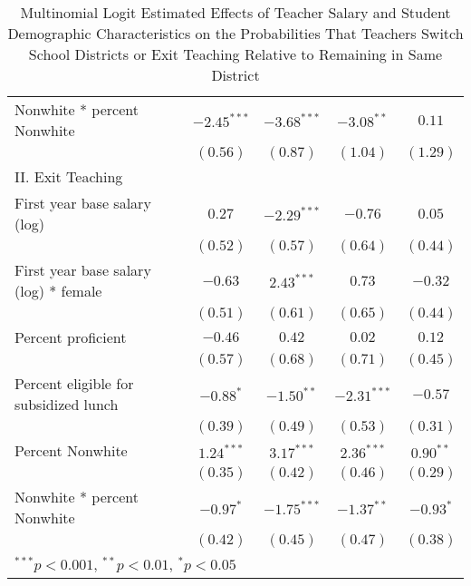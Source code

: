 \begin{table}
\begin{center}
\begin{adjustbox}{width=\textwidth,totalheight=0.9\textheight,keepaspectratio}
\begin{tabular}{l c c c c }
\quad Nonwhite * percent Nonwhite            & $-2.45^{***}$ & $-3.68^{***}$ & $-3.08^{**}$  & $0.11$       \\
                                                & $(0.56)$      & $(0.87)$      & $(1.04)$      & $(1.29)$     \\
II. Exit Teaching                               &               &               &               &              \\
\quad First year base salary (log)           & $0.27$        & $-2.29^{***}$ & $-0.76$       & $0.05$       \\
                                                & $(0.52)$      & $(0.57)$      & $(0.64)$      & $(0.44)$     \\
\quad First year base salary (log) * female  & $-0.63$       & $2.43^{***}$  & $0.73$        & $-0.32$      \\
                                                & $(0.51)$      & $(0.61)$      & $(0.65)$      & $(0.44)$     \\
\quad Percent proficient                     & $-0.46$       & $0.42$        & $0.02$        & $0.12$       \\
                                                & $(0.57)$      & $(0.68)$      & $(0.71)$      & $(0.45)$     \\
\quad Percent eligible for subsidized lunch  & $-0.88^{*}$   & $-1.50^{**}$  & $-2.31^{***}$ & $-0.57$      \\
                                                & $(0.39)$      & $(0.49)$      & $(0.53)$      & $(0.31)$     \\
\quad Percent Nonwhite                       & $1.24^{***}$  & $3.17^{***}$  & $2.36^{***}$  & $0.90^{**}$  \\
                                                & $(0.35)$      & $(0.42)$      & $(0.46)$      & $(0.29)$     \\
\quad Nonwhite * percent Nonwhite            & $-0.97^{*}$   & $-1.75^{***}$ & $-1.37^{**}$  & $-0.93^{*}$  \\
                                                & $(0.42)$      & $(0.45)$      & $(0.47)$      & $(0.38)$     \\
\hline
\multicolumn{5}{l}{\scriptsize{$^{***}p<0.001$, $^{**}p<0.01$, $^*p<0.05$}}
\end{tabular}
\end{adjustbox}
\caption{\scriptsize{Multinomial Logit Estimated Effects of Teacher Salary and Student Demographic Characteristics on the Probabilities That Teachers Switch School Districts or Exit Teaching Relative to Remaining in Same District}}
\label{tbl:reg_mlogit}
\end{center}
\end{table}

